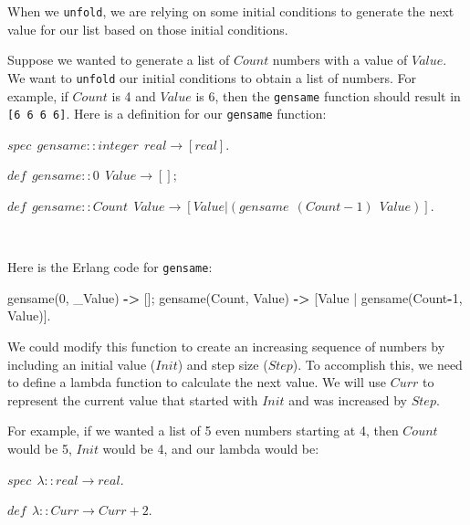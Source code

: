 \documentclass[
]{book}
\newenvironment{Shaded}{\begin{snugshade}}{\end{snugshade}}
\newcommand{\DecValTok}[1]{\textcolor[rgb]{0.00,0.00,0.81}{#1}}
\newcommand{\FunctionTok}[1]{\textcolor[rgb]{0.00,0.00,0.00}{#1}}
\newcommand{\OperatorTok}[1]{\textcolor[rgb]{0.81,0.36,0.00}{\textbf{#1}}}
\newcommand{\VariableTok}[1]{\textcolor[rgb]{0.00,0.00,0.00}{#1}}
\begin{document}
When we \texttt{unfold}, we are relying on some initial conditions to generate the next value for our list based on those initial conditions.

Suppose we wanted to generate a list of \(Count\) numbers with a value of \(Value\). We want to \texttt{unfold} our initial conditions to obtain a list of numbers. For example, if \(Count\) is 4 and \(Value\) is 6, then the \texttt{gensame} function should result in \texttt{{[}6\ 6\ 6\ 6{]}}. Here is a definition for our \texttt{gensame} function:

\begin{formulabox}
\(spec ~ ~ gensame :: integer ~ ~ real \rightarrow [real].\)

\(de\mathit{f} ~ ~ gensame :: 0 ~ ~ Value \rightarrow [];\)

\(de\mathit{f} ~ ~ gensame :: Count ~ ~ Value \rightarrow [Value | (gensame ~ ~ (Count-1) ~ ~ Value)].\)

\end{formulabox}

\(\nonumber\)

Here is the Erlang code for \texttt{gensame}:

\begin{Shaded}
\begin{Highlighting}[]
\FunctionTok{gensame(}\DecValTok{0}\FunctionTok{,} \VariableTok{\_Value}\FunctionTok{)} \OperatorTok{{-}\textgreater{}} \FunctionTok{[];}
\FunctionTok{gensame(}\VariableTok{Count}\FunctionTok{,} \VariableTok{Value}\FunctionTok{)} \OperatorTok{{-}\textgreater{}} \FunctionTok{[}\VariableTok{Value} \FunctionTok{|} \FunctionTok{gensame(}\VariableTok{Count}\OperatorTok{{-}}\DecValTok{1}\FunctionTok{,} \VariableTok{Value}\FunctionTok{)].}
\end{Highlighting}
\end{Shaded}

We could modify this function to create an increasing sequence of numbers by including an initial value (\(Init\)) and step size (\(Step\)). To accomplish this, we need to define a lambda function to calculate the next value. We will use \(Curr\) to represent the current value that started with \(Init\) and was increased by \(Step\).

For example, if we wanted a list of 5 even numbers starting at 4, then \(Count\) would be 5, \(Init\) would be 4, and our lambda would be:

\begin{formulabox}
\(spec ~ ~ \lambda :: real \rightarrow real.\)

\(de\mathit{f} ~ ~ \lambda :: Curr \rightarrow Curr + 2.\)

\end{formulabox}
\end{document}
